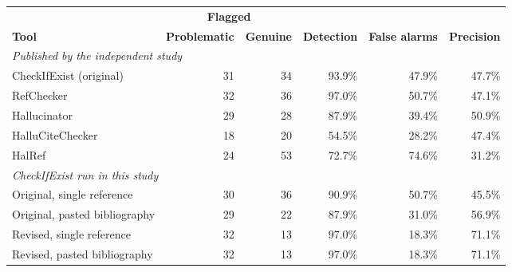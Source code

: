 \begin{tabular}{lrrrrr}
\toprule
& \multicolumn{2}{c}{\textbf{Flagged}} & & & \\
\cmidrule(lr){2-3}
\textbf{Tool} & \textbf{Problematic} & \textbf{Genuine} & \textbf{Detection} & \textbf{False alarms} & \textbf{Precision} \\
\midrule
\multicolumn{6}{l}{\textit{Published by the independent study}} \\
\quad CheckIfExist (original) & 31 & 34 & 93.9\% & 47.9\% & 47.7\% \\
\quad RefChecker & 32 & 36 & 97.0\% & 50.7\% & 47.1\% \\
\quad Hallucinator & 29 & 28 & 87.9\% & 39.4\% & 50.9\% \\
\quad HalluCiteChecker & 18 & 20 & 54.5\% & 28.2\% & 47.4\% \\
\quad HalRef & 24 & 53 & 72.7\% & 74.6\% & 31.2\% \\
\midrule
\multicolumn{6}{l}{\textit{CheckIfExist run in this study}} \\
\quad Original, single reference & 30 & 36 & 90.9\% & 50.7\% & 45.5\% \\
\quad Original, pasted bibliography & 29 & 22 & 87.9\% & 31.0\% & 56.9\% \\
\quad Revised, single reference & 32 & 13 & 97.0\% & 18.3\% & 71.1\% \\
\quad Revised, pasted bibliography & 32 & 13 & 97.0\% & 18.3\% & 71.1\% \\
\bottomrule
\end{tabular}
